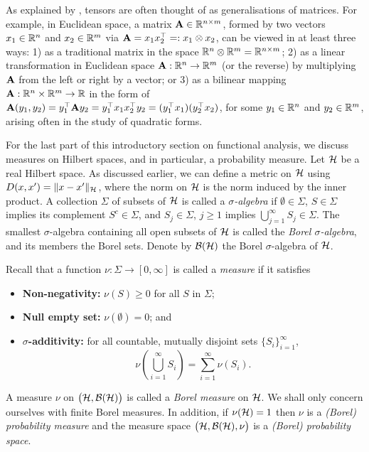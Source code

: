 \vspace{1em}
\begin{remark}
  As explained by \citet[§10.5, p. 227]{kokoszka2017introduction}, tensors are often thought of as generalisations of matrices.
  For example, in Euclidean space, a matrix ${\mathbf A} \in \mathbb{R}^{n\times m}$, formed by two vectors $x_1\in\mathbb{R}^n$ and $x_2\in\mathbb{R}^m$ via ${\mathbf A} = x_1x_2^\top =: x_1 \otimes x_2$, can be viewed in at least three ways: 
  1) as a traditional matrix in the space $\mathbb{R}^n \otimes \mathbb{R}^m = \mathbb{R}^{n\times m}$; 
  2) as a linear transformation in Euclidean space ${\mathbf A}:\mathbb{R}^n\to\mathbb{R}^m$ (or the reverse) by multiplying ${\mathbf A}$ from the left or right by a vector; or
  3) as a bilinear mapping ${\mathbf A}:\mathbb{R}^n \times \mathbb{R}^m \to \mathbb{R}$ in the form of ${\mathbf A}(y_1,y_2) = y_1^\top{\mathbf A} y_2 = y_1^\top x_1 x_2^\top y_2 = (y_1^\top x_1)(y_2^\top x_2)$, for some $y_1\in\mathbb{R}^n$ and $y_2\in\mathbb{R}^m$, arising often in the study of quadratic forms.
\end{remark}

For the last part of this introductory section on functional analysis, we discuss measures on Hilbert spaces, and in particular, a probability measure.
Let ${\mathcal H}$ be a real Hilbert space. 
As discussed earlier, we can define a metric on ${\mathcal H}$ using $D(x,x') = \lVert x-x'\rVert_{\mathcal H}$, where the norm on ${\mathcal H}$ is the norm induced by the inner product.
A collection $\Sigma$ of subsets of ${\mathcal H}$ is called a \emph{$\sigma$-algebra} if $\emptyset \in \Sigma$, $S \in \Sigma$ implies its complement $S^c \in \Sigma$, and $S_j\in\Sigma$, $j\geq 1$ implies $\bigcup_{j=1}^\infty S_j \in \Sigma$.
The smallest $\sigma$-algebra containing all open subsets of ${\mathcal H}$ is called the \emph{Borel $\sigma$-algebra}, and its members the Borel sets.
Denote by ${\mathcal B}({\mathcal H})$ the Borel $\sigma$-algebra of ${\mathcal H}$.

Recall that a function $\nu:\Sigma\to[0,\infty]$ is called a \emph{measure} if it satisfies
\begin{itemize}
  \item \textbf{Non-negativity:} $\nu(S) \geq 0$ for all $S$ in $\Sigma$;
  \item \textbf{Null empty set:} $\nu(\emptyset) = 0$; and
  \item \textbf{$\sigma$-additivity:} for all countable, mutually disjoint sets $\{S_i\}_{i=1}^\infty$,
  \[
    \nu\left(\bigcup_{i=1}^\infty S_i \right) = \sum_{i=1}^\infty \nu(S_i).
  \] 
\end{itemize}
A measure $\nu$ on $\big({\mathcal H},{\mathcal B}({\mathcal H})\big)$ is called a \emph{Borel measure} on ${\mathcal H}$.
We shall only concern ourselves with finite Borel measures. 
In addition, if $\nu({\mathcal H}) = 1$ then $\nu$ is a \emph{(Borel) probability measure} and the measure space $\big({\mathcal H},{\mathcal B}({\mathcal H}),\nu\big)$ is a \emph{(Borel) probability space}.

